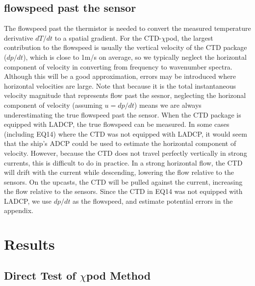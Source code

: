\documentclass{ametsoc}
\begin{document}
\subsection{flowspeed past the sensor}

The flowspeed past the thermistor is needed to convert the measured temperature derivative $dT/dt$ to a spatial gradient. For the CTD-$\chi$pod, the largest contribution to the flowspeed is usually the vertical velocity of the CTD package ($dp/dt$), which is close to 1m/s on average, so we typically neglect the horizontal component of velocity in converting from frequency to wavenumber spectra. Although this will be a good approximation, errors may be introduced where horizontal velocities are large. Note that because it is the total instantaneous velocity magnitude that represents flow past the sesnor, neglecting the horizonal component of velocity (assuming $u=dp/dt$) means we are always underestimating the true flowspeed past the sensor. When the CTD package is equipped with LADCP, the true flowspeed can be measured. In some cases (including EQ14) where the CTD was not equipped with LADCP, it would seem that the ship's ADCP could be used to estimate the horizontal component of velocity. However, because the CTD does not travel perfectly vertically in strong currents, this is difficult to do in practice. In a strong horizontal flow, the CTD will drift with the current while descending, lowering the flow relative to the sensors. On the upcasts, the CTD will be pulled against the current, increasing the flow relative to the sensors. Since the CTD in EQ14 was not equipped with LADCP, we use $dp/dt$ as the flowspeed, and estimate potential errors in the appendix.

%


\section{Results }


\subsection{Direct Test of $\chi$pod Method}
\end{document}
